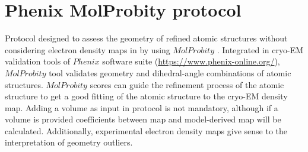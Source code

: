 \section{Phenix MolProbity protocol}
\label{app:molprobityProtocol}%
Protocol designed to assess the geometry of refined atomic structures without considering electron density maps in \scipion by using $MolProbity$ \citep{davis2004}. Integrated in cryo-EM validation tools of $Phenix$ software suite (\url{https://www.phenix-online.org/}), $MolProbity$ tool validates geometry and dihedral-angle combinations of atomic structures. $MolProbity$ scores can guide the refinement process of the atomic structure to get a good fitting of the atomic structure to the cryo-EM density map. Adding a volume as input in  protocol is not mandatory, although if a volume is provided  coefficients between map and model-derived map will be calculated. Additionally, experimental electron density maps give sense to the interpretation of geometry outliers.\\

